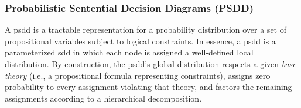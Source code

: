 \subsubsection{Probabilistic Sentential Decision Diagrams (PSDD)}
\label{sec:psdd}

A \acrfull{psdd} is a tractable representation for a probability distribution over a set of propositional variables subject to logical constraints.  In essence, a \acrshort{psdd} is a parameterized \acrfull{sdd} in which each node is assigned a well-defined local distribution.  By construction, the \acrshort{psdd}’s global distribution respects a given \emph{base theory} (i.e., a propositional formula representing constraints), assigns zero probability to every assignment violating that theory, and factors the remaining assignments according to a hierarchical decomposition.


